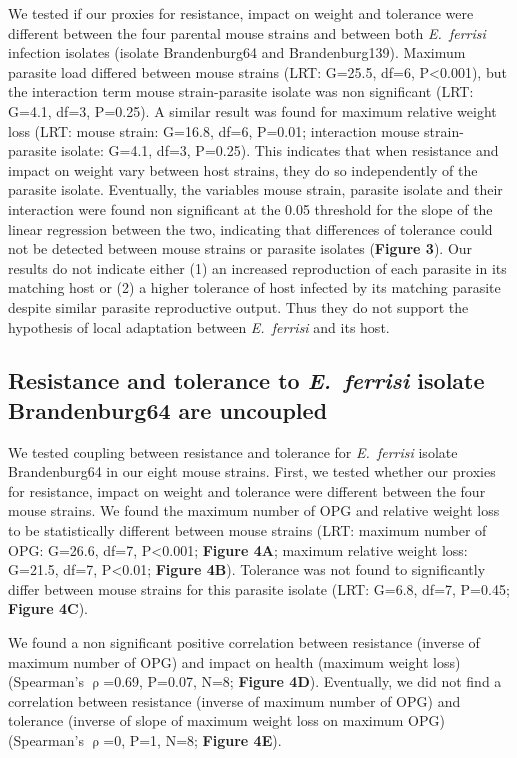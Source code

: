 \documentclass[12pt]{article}
\begin{document}
We tested if our proxies for resistance, impact on weight and tolerance were different between the four parental mouse strains and between both \textit{E.~ferrisi} infection isolates (isolate Brandenburg64 and Brandenburg139). Maximum parasite load differed between mouse strains (LRT: G=25.5, df=6, P<0.001), but the interaction term mouse strain-parasite isolate was non significant (LRT: G=4.1, df=3, P=0.25). A similar result was found for maximum relative weight loss (LRT: mouse strain: G=16.8, df=6, P=0.01; interaction mouse strain-parasite isolate: G=4.1, df=3, P=0.25). This indicates that when resistance and impact on weight vary between host strains, they do so independently of the parasite isolate. Eventually, the variables mouse strain, parasite isolate and their interaction were found non significant at the 0.05 threshold for the slope of the linear regression between the two, indicating that differences of tolerance could not be detected between mouse strains or parasite isolates (\textbf{Figure 3}). Our results do not indicate either (1) an increased reproduction of each parasite in its matching host or (2) a higher tolerance of host infected by its matching parasite despite similar parasite reproductive output. Thus they do not support the hypothesis of local adaptation between \textit{E.~ferrisi} and its host.

\subsection{Resistance and tolerance to \textit{E.~ferrisi }isolate Brandenburg64 are uncoupled}

We tested coupling between resistance and tolerance for \textit{E.~ferrisi} isolate Brandenburg64 in our eight mouse strains. First, we tested whether our proxies for resistance, impact on weight and tolerance were different between the four mouse strains. We found the maximum number of OPG and relative weight loss to be statistically different between mouse strains (LRT: maximum number of OPG: G=26.6, df=7, P<0.001; \textbf{Figure 4A}; maximum relative weight loss: G=21.5, df=7, P<0.01; \textbf{Figure 4B}). Tolerance was not found to significantly differ between mouse strains for this parasite isolate (LRT: G=6.8, df=7, P=0.45; \textbf{Figure 4C}).\par

We found a non significant positive correlation between resistance (inverse of maximum number of OPG) and impact on health (maximum weight loss) (Spearman's $\uprho$=0.69, P=0.07, N=8; \textbf{Figure 4D}). Eventually, we did not find a correlation between resistance (inverse of maximum number of OPG) and tolerance (inverse of slope of maximum weight loss on maximum OPG) (Spearman's $\uprho$=0, P=1, N=8; \textbf{Figure 4E}). \par
\end{document}
